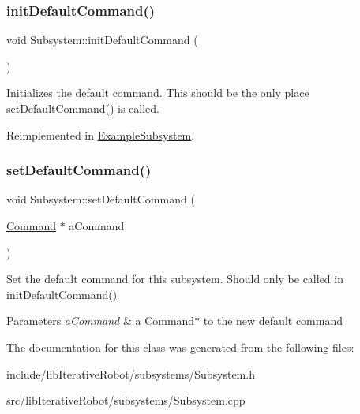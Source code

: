 \subsubsection{\texorpdfstring{initDefaultCommand()}{initDefaultCommand()}}
{\footnotesize\ttfamily void Subsystem\+::init\+Default\+Command (\begin{DoxyParamCaption}{ }\end{DoxyParamCaption})\hspace{0.3cm}{\ttfamily [virtual]}}

Initializes the default command. This should be the only place \mbox{\hyperlink{classlib_iterative_robot_1_1_subsystem_a6fff5c5756245ac750c2b26ee0ed2be7}{set\+Default\+Command()}} is called. 

Reimplemented in \mbox{\hyperlink{class_example_subsystem_a147ea127ab9c71f9d86e4f5e5a4e9d5a}{Example\+Subsystem}}.

\mbox{\label{classlib_iterative_robot_1_1_subsystem_a6fff5c5756245ac750c2b26ee0ed2be7}} 
\subsubsection{\texorpdfstring{setDefaultCommand()}{setDefaultCommand()}}
{\footnotesize\ttfamily void Subsystem\+::set\+Default\+Command (\begin{DoxyParamCaption}\item[{\mbox{\hyperlink{classlib_iterative_robot_1_1_command}{Command}} $\ast$}]{a\+Command }\end{DoxyParamCaption})\hspace{0.3cm}{\ttfamily [protected]}}

Set the default command for this subsystem. Should only be called in \mbox{\hyperlink{classlib_iterative_robot_1_1_subsystem_a30bd6c33c84c896f31ed01c8331aab57}{init\+Default\+Command()}}


\begin{DoxyParams}{Parameters}
{\em a\+Command} & a Command$\ast$ to the new default command \\
\hline
\end{DoxyParams}


The documentation for this class was generated from the following files\+:\begin{DoxyCompactItemize}
\item 
include/lib\+Iterative\+Robot/subsystems/Subsystem.\+h\item 
src/lib\+Iterative\+Robot/subsystems/Subsystem.\+cpp\end{DoxyCompactItemize}
